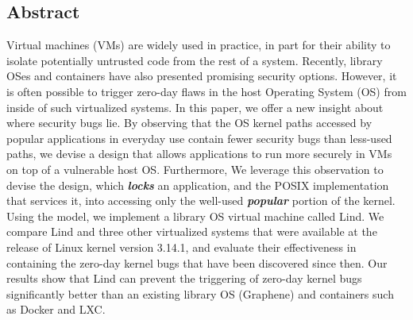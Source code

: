 \subsection*{Abstract}

Virtual machines (VMs) are widely used in practice, in part for their ability to
isolate potentially untrusted code from the rest of a system.
Recently, library OSes and containers have also presented promising security options.
%
However, it is often possible to trigger zero-day flaws
in the host Operating System (OS) from inside of such virtualized systems.
%
In this paper, we offer a new insight about where security bugs lie. By observing that the OS kernel paths accessed
by popular applications in everyday use contain fewer security bugs than less-used paths, we devise a design that allows applications to run more securely in VMs on top of a vulnerable host OS.
Furthermore, We
leverage this observation to devise the \lip design, which
\textbf{\textit{locks}} an application, and the POSIX implementation that services it, into
accessing only the well-used \textbf{\textit{popular}} portion of the kernel.  Using the \lip model, we
implement a library OS virtual machine called Lind.
%
We compare Lind and three other virtualized systems that were
available at the release of Linux kernel version 3.14.1, and evaluate
their effectiveness in containing the zero-day kernel bugs that have been discovered
since then.
%
Our results show that Lind can prevent the triggering of zero-day kernel bugs significantly better
than an existing library OS (Graphene) and containers such as Docker and LXC.
